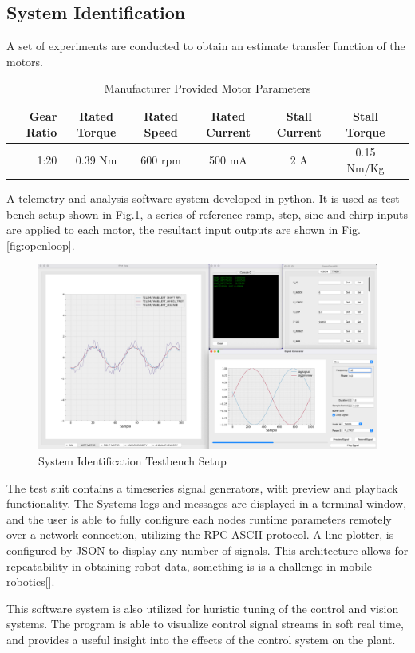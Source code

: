         \subsection{System Identification}
        A set of experiments are conducted to obtain an estimate transfer function of the motors.
        \begin{table}[H]
            \centering
                \begin{tabular}{|r|c|c|c|c|c|c|}
                    \hline 
                    Gear Ratio & Rated Torque & Rated Speed  & Rated Current & Stall Current & Stall Torque \\
                    \hline
                     1:20  & 0.39 Nm & 600 rpm & 500 mA & 2 A & 0.15 Nm/Kg \\
                    \hline
                \end{tabular}
                \caption{Manufacturer Provided Motor Parameters}
        \end{table}
        A telemetry and analysis software system developed in python. It is used as 
        test bench  setup shown in Fig.\ref{fig:SysIDSetUp}, a series of reference 
        ramp, step, sine and chirp inputs are applied to each motor, 
        the resultant input outputs are shown 
        in Fig.\ref{fig:openloop}.
       
        \begin{figure}[H]
            \centering
            \includegraphics[height=0.\textwidth]{SysIDMotorSetUp.png}
            \caption{System Identification Testbench Setup}
            \label{fig:SysIDSetUp}
        \end{figure}
        The test suit contains a timeseries signal generators, with preview and playback functionality.
        The Systems logs and messages are displayed in a terminal window, and the user is able to fully configure 
        each nodes runtime parameters remotely over a network connection, utilizing the RPC ASCII protocol.
        A line plotter, is configured by JSON to display any number of signals.
        This architecture allows for repeatability in obtaining robot data, something 
        is is a challenge in mobile robotics[]. 
        
        This software system is also utilized for huristic tuning of the control
        and vision systems. The program is able to visualize control signal streams in soft real time, 
        and provides a useful insight into the effects of the control system on the plant.

